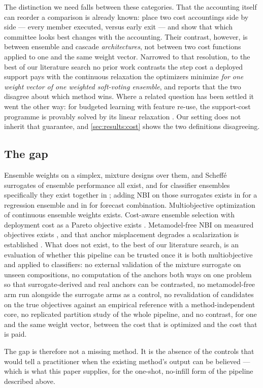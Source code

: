 The distinction we need falls between these categories. That the accounting itself can reorder a comparison is
already known: \citet{wang2022committees} place two cost accountings side by side --- every member executed, versus
early exit --- and show that which committee looks best changes with the accounting. Their contrast, however, is
between ensemble and cascade \emph{architectures}, not between two cost functions applied to one and the same weight
vector. Narrowed to that resolution, to the best of our literature search no prior work contrasts the step cost a
deployed support pays with the continuous relaxation the optimizers minimize \emph{for one weight vector of one
weighted soft-voting ensemble}, and reports that the two disagree about which method wins. Where a related question
has been settled it went the other way: for budgeted learning with feature re-use, the support-cost programme is
provably solved by its linear relaxation \citep{nan2015budgeted}. Our setting does not
inherit that guarantee, and \cref{sec:results:cost} shows the two definitions disagreeing.

\subsection{The gap}
\label{sec:rel:gap}

Ensemble weights on a simplex, mixture designs over them, and Scheffé surrogates of ensemble performance all exist,
and for classifier ensembles specifically they exist together in \citet{kwon2024ensemble}; adding NBI on those
surrogates exists in \citet{rocha2025ensemblestlf} for a regression ensemble and in \citet{bacci2019nbi_mixture} for
forecast combination. Multiobjective optimization of continuous ensemble weights exists. Cost-aware ensemble selection
with deployment cost as a Pareto objective exists \citep{maier2024hardware,maier2026hapens}. Metamodel-free NBI on
measured objectives exists \citep{gellerich2023doenbi}, and that anchor misplacement degrades a scalarization is
established \citep{isermann1988payoff,deb2010nadir,herrmann2026nonextreme}. What does not exist, to the best of our
literature search, is an evaluation of whether this pipeline can be trusted once it is both multiobjective and applied
to classifiers: no external validation of the mixture surrogate on unseen compositions, no computation of the anchors
both ways on one problem so that surrogate-derived and real anchors can be contrasted, no metamodel-free arm run
alongside the surrogate arms as a control, no revalidation of candidates on the true objectives against an
empirical reference with a method-independent core, no replicated partition study of the whole pipeline, and no
contrast, for one and the same weight vector, between the cost that is optimized and the cost that is paid.

The gap is therefore not a missing method. It is the absence of the controls that would tell a practitioner when the
existing method's output can be believed --- which is what this paper supplies, for the one-shot, no-infill form of
the pipeline described above.
